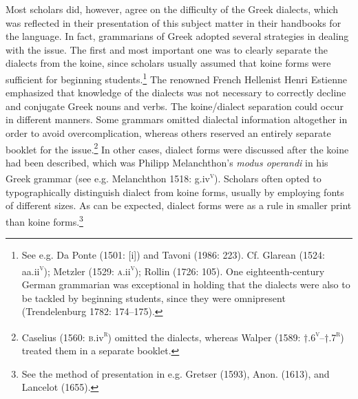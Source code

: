 \begin{styleStandard}
Most scholars did, however, agree on the difficulty of the Greek dialects, which was reflected in their presentation of this subject matter in their handbooks for the language. In fact, grammarians of Greek adopted several strategies in dealing with the issue. The first and most important one was to clearly separate the dialects from the koine, since scholars usually assumed that koine forms were sufficient for beginning students.\footnote{ See e.g. Da Ponte (1501: [i]) and Tavoni (1986: 223). Cf. Glarean (1524: aa.ii\textsc{\textsuperscript{v}}); Metzler (1529: \textsc{a}.ii\textsc{\textsuperscript{v}}); Rollin (1726: 105). One eighteenth-century German grammarian was exceptional in holding that the dialects were also to be tackled by beginning students, since they were omnipresent (Trendelenburg 1782: 174–175).} The renowned French Hellenist Henri Estienne emphasized that knowledge of the dialects was not necessary to correctly decline and conjugate Greek nouns and verbs. The koine/dialect separation could occur in different manners. Some grammars omitted dialectal information altogether in order to avoid overcomplication, whereas others reserved an entirely separate booklet for the issue.\footnote{ Caselius (1560: \textsc{b.}iv\textsc{\textsuperscript{r}}) omitted the dialects, whereas Walper (1589: †.6\textsc{\textsuperscript{v}}–†.7\textsc{\textsuperscript{r}}) treated them in a separate booklet.} In other cases, dialect forms were discussed after the koine had been described, which was Philipp Melanchthon’s \textit{modus operandi} in his Greek grammar (see e.g. Melanchthon 1518: g.iv\textsc{\textsuperscript{v}}). Scholars often opted to typographically distinguish dialect from koine forms, usually by employing fonts of different sizes. As can be expected, dialect forms were as a rule in smaller print than koine forms.\footnote{ See the method of presentation in e.g. Gretser (1593), Anon. (1613), and Lancelot (1655).}
\end{styleStandard}

